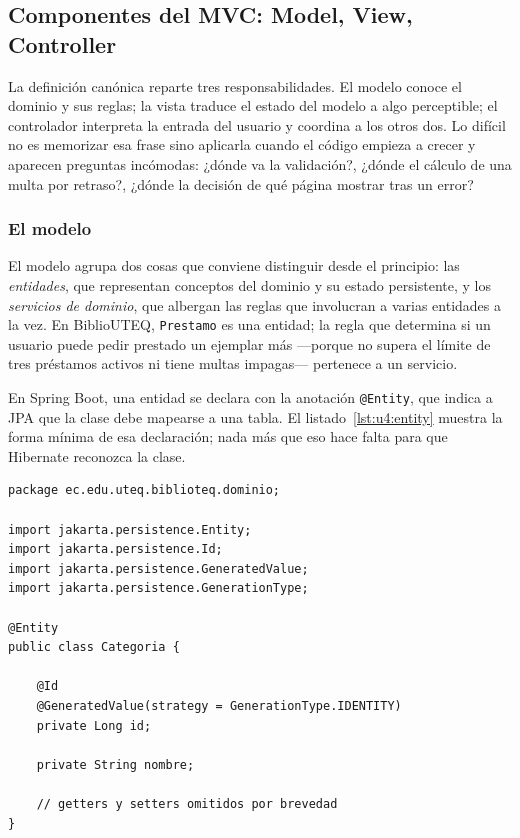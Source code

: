 \documentclass[11pt,a4paper,openany]{book}
\begin{document}
\subsection{Componentes del MVC: Model, View, Controller}
\label{sec:u4:componentes}

La definición canónica reparte tres responsabilidades. El modelo conoce el dominio y sus reglas; la vista traduce el estado del modelo a algo perceptible; el controlador interpreta la entrada del usuario y coordina a los otros dos. Lo difícil no es memorizar esa frase sino aplicarla cuando el código empieza a crecer y aparecen preguntas incómodas: ¿dónde va la validación?, ¿dónde el cálculo de una multa por retraso?, ¿dónde la decisión de qué página mostrar tras un error?

\subsubsection{El modelo}

El modelo agrupa dos cosas que conviene distinguir desde el principio: las \emph{entidades}, que representan conceptos del dominio y su estado persistente, y los \emph{servicios de dominio}, que albergan las reglas que involucran a varias entidades a la vez. En BiblioUTEQ, \texttt{Prestamo} es una entidad; la regla que determina si un usuario puede pedir prestado un ejemplar más ---porque no supera el límite de tres préstamos activos ni tiene multas impagas--- pertenece a un servicio.

En Spring Boot, una entidad se declara con la anotación \texttt{@Entity}, que indica a JPA que la clase debe mapearse a una tabla. El listado~\ref{lst:u4:entity} muestra la forma mínima de esa declaración; nada más que eso hace falta para que Hibernate reconozca la clase.

\begin{lstlisting}[style=java,caption={Declaracion minima de una entidad de dominio.},label={lst:u4:entity}]
package ec.edu.uteq.biblioteq.dominio;

import jakarta.persistence.Entity;
import jakarta.persistence.Id;
import jakarta.persistence.GeneratedValue;
import jakarta.persistence.GenerationType;

@Entity
public class Categoria {

	@Id
	@GeneratedValue(strategy = GenerationType.IDENTITY)
	private Long id;

	private String nombre;

	// getters y setters omitidos por brevedad
}
\end{lstlisting}
\end{document}
